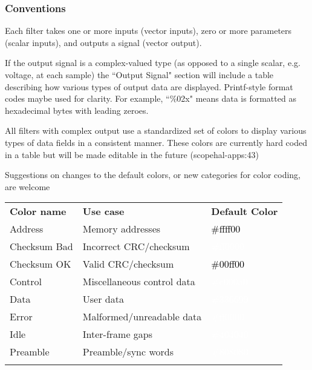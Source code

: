 \subsubsection{Conventions}

Each filter takes one or more inputs (vector inputs), zero or more parameters (scalar inputs), and outputs a
signal (vector output).

If the output signal is a complex-valued type (as opposed to a single scalar, e.g. voltage, at each sample) the
``Output Signal" section will include a table describing how various types of output data are displayed. Printf-style
format codes maybe used for clarity. For example, ``\%02x" means data is formatted as hexadecimal bytes with leading
zeroes.

All filters with complex output use a standardized set of colors to display various types of data fields in a
consistent manner. These colors are currently hard coded in a table but will be made editable in the future
(scopehal-apps:43)

Suggestions on changes to the default colors, or new categories for color coding, are welcome

\begin{tabularx}{16cm}{llX}
\thickhline
\textbf{Color name} & \textbf{Use case} & \textbf{Default Color} \\
\thickhline
Address & Memory addresses & \cellcolor{address}\textcolor{black}{\#ffff00} \\
\thickhline
Checksum Bad & Incorrect CRC/checksum & \cellcolor{checksumbad}\textcolor{white}{\#ff0000} \\
\thickhline
Checksum OK & Valid CRC/checksum & \cellcolor{checksumok}\textcolor{black}{\#00ff00} \\
\thickhline
Control & Miscellaneous control data & \cellcolor{control}\textcolor{white}{\#c000a0} \\
\thickhline
Data & User data & \cellcolor{data}\textcolor{white}{\#336699} \\
\thickhline
Error & Malformed/unreadable data & \cellcolor{error}\textcolor{white}{\#ff0000} \\
\thickhline
Idle & Inter-frame gaps & \cellcolor{idle}\textcolor{white}{\#404040} \\
\thickhline
Preamble & Preamble/sync words & \cellcolor{preamble}\textcolor{white}{\#808080} \\
\thickhline
\end{tabularx}

\pagebreak
